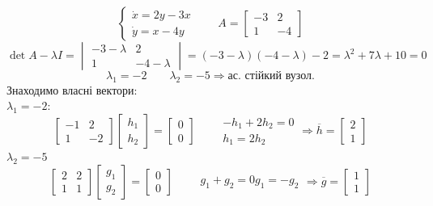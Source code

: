 \begin{example}
    $$
    \begin{cases}
    \dot{x} = 2y - 3x\\
    \dot{y} = x - 4y
    \end{cases} \qquad A = \begin{bmatrix}
     -3 & 2 \\
     1 & -4
    \end{bmatrix}
    $$
    $$
    \det{A - \lambda I} = \begin{vmatrix}
      -3 - \lambda & 2 \\
      1 & -4 - \lambda
    \end{vmatrix}  = (-3-\lambda) (-4 - \lambda) -2 = \lambda^2 + 7 \lambda + 10 = 0
    $$
    $$
    \lambda_1 = -2 \qquad \lambda_2 = -5 \Rightarrow \text{ас. стійкий вузол.}
    $$
    Знаходимо власні вектори:\\
    $\lambda_1 = -2$:
    $$
    \begin{bmatrix}
     -1 & 2 \\
     1 & -2
    \end{bmatrix} \begin{bmatrix}
     h_1 \\
     h_2
    \end{bmatrix} = \begin{bmatrix}
     0 \\
     0
    \end{bmatrix} \qquad \begin{gathered}
     -h_1 + 2h_2 = 0\\
     h_1 = 2 h_2
    \end{gathered} \Rightarrow \overline{h} = \begin{bmatrix}
     2 \\
     1
    \end{bmatrix}
    $$
    $\lambda_2 = -5$
    $$
    \begin{bmatrix}
     2 & 2 \\
     1 & 1
    \end{bmatrix} \begin{bmatrix}
     g_1 \\
     g_2
    \end{bmatrix} = \begin{bmatrix}
     0 \\
     0
    \end{bmatrix}
    \qquad \begin{gathered}
     g_1 + g_2 = 0
     g_1 = - g_2
    \end{gathered} \Rightarrow \overline{g} = \begin{bmatrix}
     1 \\
     1 
    \end{bmatrix}
    $$
\end{example}

